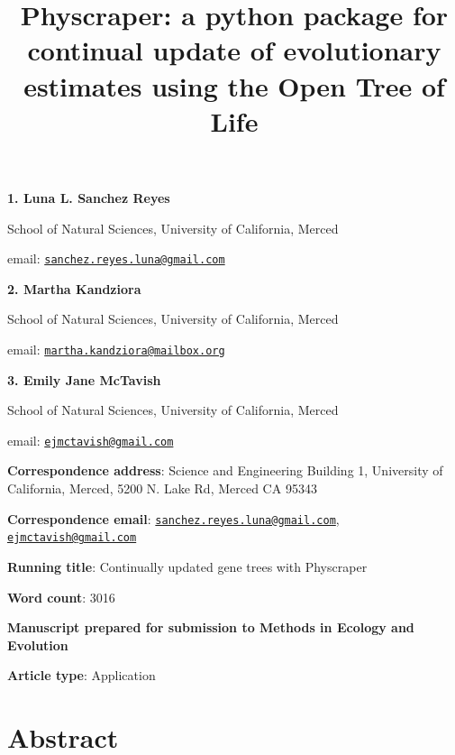 \documentclass[]{article}
\title{Physcraper: a python package for continual update of evolutionary estimates using the Open Tree of Life}
\author{}
\date{\vspace{-2.5em}}
\begin{document}
\maketitle

\textbf{1. Luna L. Sanchez Reyes}

School of Natural Sciences, University of California, Merced

email: \href{mailto:sanchez.reyes.luna@gmail.com}{\nolinkurl{sanchez.reyes.luna@gmail.com}}

\textbf{2. Martha Kandziora}

School of Natural Sciences, University of California, Merced

email: \href{mailto:martha.kandziora@mailbox.org}{\nolinkurl{martha.kandziora@mailbox.org}}

\textbf{3. Emily Jane McTavish}

School of Natural Sciences, University of California, Merced

email: \href{mailto:ejmctavish@gmail.com}{\nolinkurl{ejmctavish@gmail.com}}

\textbf{Correspondence address}: Science and Engineering Building 1, University of California, Merced, 5200 N. Lake Rd, Merced CA 95343

\textbf{Correspondence email}: \href{mailto:sanchez.reyes.luna@gmail.com}{\nolinkurl{sanchez.reyes.luna@gmail.com}}, \href{mailto:ejmctavish@gmail.com}{\nolinkurl{ejmctavish@gmail.com}}

\textbf{Running title}: Continually updated gene trees with Physcraper

\textbf{Word count}: 3016

\textbf{Manuscript prepared for submission to Methods in Ecology and Evolution}

\textbf{Article type}: Application

\newpage

\hypertarget{abstract}{%
\section{Abstract}\label{abstract}}
\end{document}
